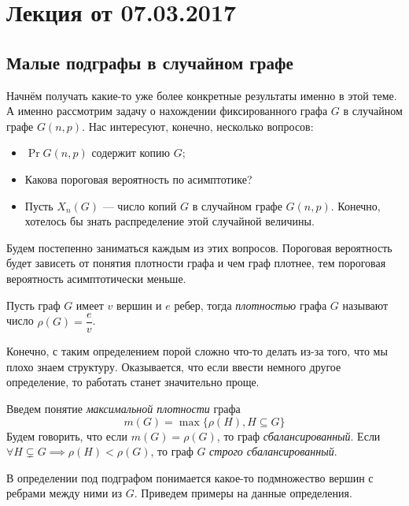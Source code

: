 \section{Лекция от 07.03.2017}

\subsection{Малые подграфы в случайном графе}

Начнём получать какие-то уже более конкретные результаты именно в этой теме.
А именно рассмотрим задачу о нахождении фиксированного графа $G$ в случайном
графе $G(n, p)$. Нас интересуют, конечно, несколько вопросов:

\begin{itemize}
  \item $\Pr{G(n, p) \text{ содержит копию } G}$;
  \item Какова пороговая вероятность по асимптотике?
  \item Пусть $X_n(G)$ --- число копий $G$ в случайном графе $G(n, p)$. Конечно,
  хотелось бы знать распределение этой случайной величины.
\end{itemize}

Будем постепенно заниматься каждым из этих вопросов. Пороговая вероятность будет
зависеть от понятия плотности графа и чем граф плотнее, тем пороговая вероятность
асимптотически меньше.

\begin{definition}
  Пусть граф $G$ имеет $v$ вершин и $e$ ребер, тогда \textit{плотностью} графа $G$ называют
  число $\rho(G) = \dfrac{e}{v}$.
\end{definition}

Конечно, с таким определением порой сложно что-то делать из-за того, что мы плохо
знаем структуру. Оказывается, что если ввести немного другое определение, то
работать станет значительно проще.

\begin{definition}
  Введем понятие \textit{максимальной плотности} графа
  \[
    m(G) = \max\{\rho(H), H \subseteq G\}
  \]
  Будем говорить, что если $m(G) = \rho(G)$, то граф \textit{сбалансированный}. Если
  $\forall H \varsubsetneq G \implies \rho(H) < \rho(G)$, то граф $G$ \textit{строго сбалансированный}.
\end{definition}

В определении под подграфом понимается какое-то подмножество вершин с ребрами между
ними из $G$. Приведем примеры на данные определения.

